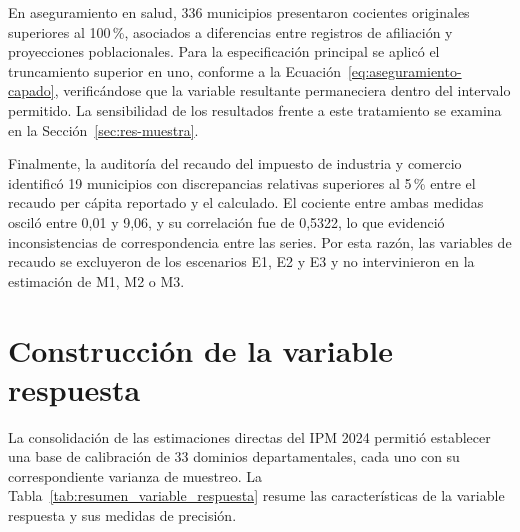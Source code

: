 En aseguramiento en salud, 336 municipios presentaron cocientes originales superiores al 100\,\%, asociados a diferencias entre registros de afiliación y proyecciones poblacionales. Para la especificación principal se aplicó el truncamiento superior en uno, conforme a la Ecuación~\ref{eq:aseguramiento-capado}, verificándose que la variable resultante permaneciera dentro del intervalo permitido. La sensibilidad de los resultados frente a este tratamiento se examina en la Sección~\ref{sec:res-muestra}.

Finalmente, la auditoría del recaudo del impuesto de industria y comercio identificó 19 municipios con discrepancias relativas superiores al 5\,\% entre el recaudo per cápita reportado y el calculado. El cociente entre ambas medidas osciló entre 0,01 y 9,06, y su correlación fue de 0,5322, lo que evidenció inconsistencias de correspondencia entre las series. Por esta razón, las variables de recaudo se excluyeron de los escenarios E1, E2 y E3 y no intervinieron en la estimación de M1, M2 o M3.



\section{Construcción de la variable respuesta}
\label{sec:res-respuesta}

La consolidación de las estimaciones directas del IPM 2024 permitió establecer una base de calibración de 33 dominios departamentales, cada uno con su correspondiente varianza de muestreo. La Tabla~\ref{tab:resumen_variable_respuesta} resume las características de la variable respuesta y sus medidas de precisión.


